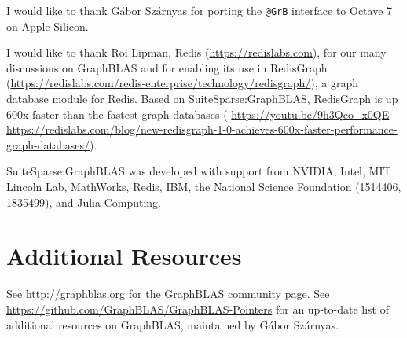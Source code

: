 \documentclass[12pt]{article}
\begin{document}
I would like to thank G{\'{a}}bor Sz{\'{a}}rnyas for porting the \verb'@GrB'
interface to Octave 7 on Apple Silicon.

I would like to thank Roi Lipman, Redis (\url{https://redislabs.com}), for
our many discussions on GraphBLAS and for enabling its use in RedisGraph
(\url{https://redislabs.com/redis-enterprise/technology/redisgraph/}), a graph
database module for Redis.  Based on SuiteSparse:GraphBLAS, RedisGraph is up
600x faster than the fastest graph databases ({\footnotesize
\url{https://youtu.be/9h3Qco_x0QE} \newline
\url{https://redislabs.com/blog/new-redisgraph-1-0-achieves-600x-faster-performance-graph-databases/}}).

SuiteSparse:GraphBLAS was developed with support from
NVIDIA, Intel, MIT Lincoln Lab, MathWorks, Redis, IBM,
the National Science Foundation (1514406, 1835499), and Julia Computing.

\section{Additional Resources}

See \url{http://graphblas.org} for the GraphBLAS community page.  See
\url{https://github.com/GraphBLAS/GraphBLAS-Pointers} for an up-to-date list of
additional resources on GraphBLAS, maintained by G{\'{a}}bor Sz{\'{a}}rnyas.

{\footnotesize
{}


}
\end{document}
